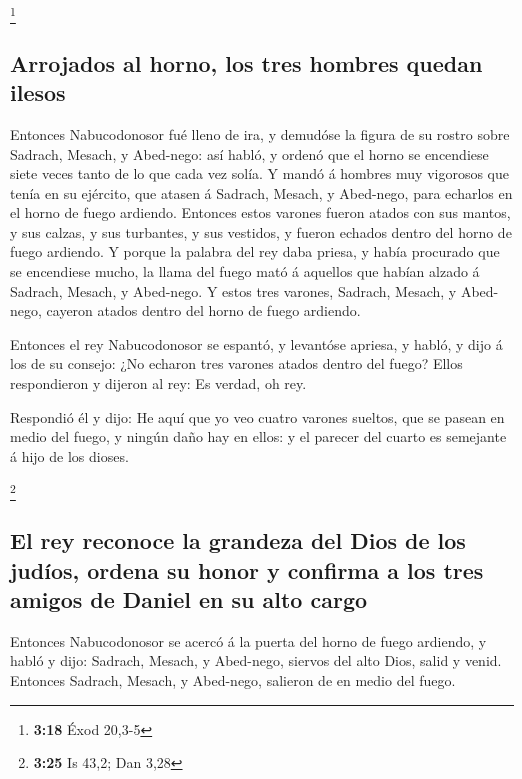 \footnote{\textbf{3:18} Éxod 20,3-5}

\hypertarget{arrojados-al-horno-los-tres-hombres-quedan-ilesos}{%
\subsection{Arrojados al horno, los tres hombres quedan
ilesos}\label{arrojados-al-horno-los-tres-hombres-quedan-ilesos}}

 Entonces Nabucodonosor fué lleno de ira, y demudóse la
figura de su rostro sobre Sadrach, Mesach, y Abed-nego: así habló, y
ordenó que el horno se encendiese siete veces tanto de lo que cada vez
solía.  Y mandó á hombres muy vigorosos que tenía en su
ejército, que atasen á Sadrach, Mesach, y Abed-nego, para echarlos en el
horno de fuego ardiendo.  Entonces estos varones fueron
atados con sus mantos, y sus calzas, y sus turbantes, y sus vestidos, y
fueron echados dentro del horno de fuego ardiendo.  Y
porque la palabra del rey daba priesa, y había procurado que se
encendiese mucho, la llama del fuego mató á aquellos que habían alzado á
Sadrach, Mesach, y Abed-nego.  Y estos tres varones,
Sadrach, Mesach, y Abed-nego, cayeron atados dentro del horno de fuego
ardiendo.

 Entonces el rey Nabucodonosor se espantó, y levantóse
apriesa, y habló, y dijo á los de su consejo: ¿No echaron tres varones
atados dentro del fuego? Ellos respondieron y dijeron al rey: Es verdad,
oh rey.

 Respondió él y dijo: He aquí que yo veo cuatro varones
sueltos, que se pasean en medio del fuego, y ningún daño hay en ellos: y
el parecer del cuarto es semejante á hijo de los dioses.

\footnote{\textbf{3:25} Is 43,2; Dan 3,28}

\hypertarget{el-rey-reconoce-la-grandeza-del-dios-de-los-juduxedos-ordena-su-honor-y-confirma-a-los-tres-amigos-de-daniel-en-su-alto-cargo}{%
\subsection{El rey reconoce la grandeza del Dios de los judíos, ordena
su honor y confirma a los tres amigos de Daniel en su alto
cargo}\label{el-rey-reconoce-la-grandeza-del-dios-de-los-juduxedos-ordena-su-honor-y-confirma-a-los-tres-amigos-de-daniel-en-su-alto-cargo}}

 Entonces Nabucodonosor se acercó á la puerta del horno de
fuego ardiendo, y habló y dijo: Sadrach, Mesach, y Abed-nego, siervos
del alto Dios, salid y venid. Entonces Sadrach, Mesach, y Abed-nego,
salieron de en medio del fuego.

